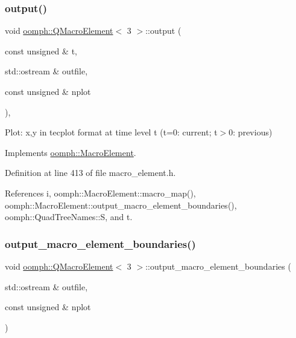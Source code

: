 \subsubsection{\texorpdfstring{output()}{output()}}
{\footnotesize\ttfamily void \hyperlink{classoomph_1_1QMacroElement}{oomph\+::\+Q\+Macro\+Element}$<$ 3 $>$\+::output (\begin{DoxyParamCaption}\item[{const unsigned \&}]{t,  }\item[{std\+::ostream \&}]{outfile,  }\item[{const unsigned \&}]{nplot }\end{DoxyParamCaption})\hspace{0.3cm}{\ttfamily [inline]}, {\ttfamily [virtual]}}



Plot\+: x,y in tecplot format at time level t (t=0\+: current; t$>$0\+: previous) 



Implements \hyperlink{classoomph_1_1MacroElement_a5d3646716d60aedf456889768a3c2dbe}{oomph\+::\+Macro\+Element}.



Definition at line 413 of file macro\+\_\+element.\+h.



References i, oomph\+::\+Macro\+Element\+::macro\+\_\+map(), oomph\+::\+Macro\+Element\+::output\+\_\+macro\+\_\+element\+\_\+boundaries(), oomph\+::\+Quad\+Tree\+Names\+::S, and t.

\mbox{\label{classoomph_1_1QMacroElement_3_013_01_4_aeb5d117bf346d710bd4f8fc4f04dbfd5}} 
\subsubsection{\texorpdfstring{output\+\_\+macro\+\_\+element\+\_\+boundaries()}{output\_macro\_element\_boundaries()}}
{\footnotesize\ttfamily void \hyperlink{classoomph_1_1QMacroElement}{oomph\+::\+Q\+Macro\+Element}$<$ 3 $>$\+::output\+\_\+macro\+\_\+element\+\_\+boundaries (\begin{DoxyParamCaption}\item[{std\+::ostream \&}]{outfile,  }\item[{const unsigned \&}]{nplot }\end{DoxyParamCaption})\hspace{0.3cm}{\ttfamily [virtual]}}




